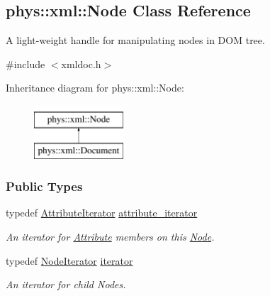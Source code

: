 \hypertarget{classphys_1_1xml_1_1Node}{
\subsection{phys::xml::Node Class Reference}
\label{classphys_1_1xml_1_1Node}
}


A light-\/weight handle for manipulating nodes in DOM tree.  




{\ttfamily \#include $<$xmldoc.h$>$}

Inheritance diagram for phys::xml::Node:\begin{figure}[H]
\begin{center}
\leavevmode
\includegraphics[height=2.000000cm]{classphys_1_1xml_1_1Node}
\end{center}
\end{figure}
\subsubsection*{Public Types}
\begin{DoxyCompactItemize}
\item 
\hypertarget{classphys_1_1xml_1_1Node_a80e590c48449971c999e50a371a3b504}{
typedef \hyperlink{classphys_1_1xml_1_1AttributeIterator}{AttributeIterator} \hyperlink{classphys_1_1xml_1_1Node_a80e590c48449971c999e50a371a3b504}{attribute\_\-iterator}}
\label{classphys_1_1xml_1_1Node_a80e590c48449971c999e50a371a3b504}

\begin{DoxyCompactList}\small\item\em An iterator for \hyperlink{classphys_1_1xml_1_1Attribute}{Attribute} members on this \hyperlink{classphys_1_1xml_1_1Node}{Node}. \item\end{DoxyCompactList}\item 
\hypertarget{classphys_1_1xml_1_1Node_a1b84d9f01a7c786aae85bf365aa5fd7a}{
typedef \hyperlink{classphys_1_1xml_1_1NodeIterator}{NodeIterator} \hyperlink{classphys_1_1xml_1_1Node_a1b84d9f01a7c786aae85bf365aa5fd7a}{iterator}}
\label{classphys_1_1xml_1_1Node_a1b84d9f01a7c786aae85bf365aa5fd7a}

\begin{DoxyCompactList}\small\item\em An iterator for child Nodes. \item\end{DoxyCompactList}\end{DoxyCompactItemize}
